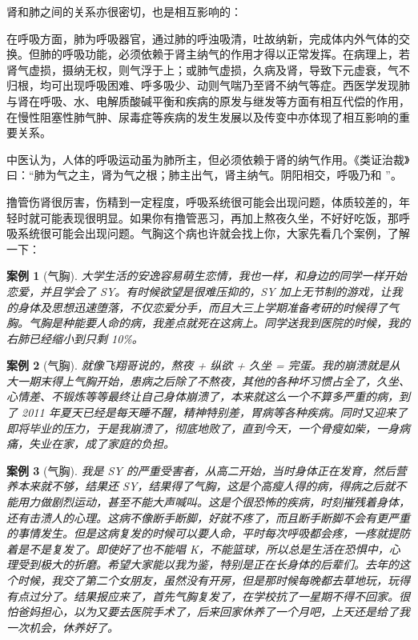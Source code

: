 \documentclass{ctexart}
\newtheorem{case}{案例}
\begin{document}
肾和肺之间的关系亦很密切，也是相互影响的：

在呼吸方面，肺为呼吸器官，通过肺的呼浊吸清，吐故纳新，完成体内外气体的交换。但肺的呼吸功能，必须依赖于肾主纳气的作用才得以正常发挥。在病理上，若肾气虚损，摄纳无权，则气浮于上；或肺气虚损，久病及肾，导致下元虚衰，气不归根，均可出现呼吸困难、呼多吸少、动则气喘乃至肾不纳气等症。西医学发现肺与肾在呼吸、水、电解质酸碱平衡和疾病的原发与继发等方面有相互代偿的作用，在慢性阻塞性肺气肿、尿毒症等疾病的发生发展以及传变中亦体现了相互影响的重要关系。

中医认为，人体的呼吸运动虽为肺所主，但必须依赖于肾的纳气作用。《类证治裁》曰：“肺为气之主，肾为气之根；肺主出气，肾主纳气。阴阳相交，呼吸乃和 ”。

撸管伤肾很厉害，伤精到一定程度，呼吸系统很可能会出现问题，体质较差的，年轻时就可能表现很明显。如果你有撸管恶习，再加上熬夜久坐，不好好吃饭，那呼吸系统很可能会出现问题。气胸这个病也许就会找上你，大家先看几个案例，了解一下：

\begin{case}[气胸]
    大学生活的安逸容易萌生恋情，我也一样，和身边的同学一样开始恋爱，并且学会了 SY。有时候欲望是很难压抑的，SY 加上无节制的游戏，让我的身体及思想迅速堕落，不仅恋爱分手，而且大三上学期准备考研的时候得了气胸。气胸是种能要人命的病，我差点就死在这病上。同学送我到医院的时候，我的右肺已经缩小到只剩 10\%。
\end{case}

\begin{case}[气胸]
    就像飞翔哥说的，熬夜 + 纵欲 + 久坐 = 完蛋。我的崩溃就是从大一期末得上气胸开始，患病之后除了不熬夜，其他的各种坏习惯占全了，久坐、心情差、不锻炼等等最终让自己身体崩溃了，本来就这么一个不算多严重的病，到了 2011 年夏天已经是每天睡不醒，精神特别差，胃病等各种疾病。同时又迎来了即将毕业的压力，于是我崩溃了，彻底地败了，直到今天，一个骨瘦如柴，一身病痛，失业在家，成了家庭的负担。
\end{case}

\begin{case}[气胸]
    我是 SY 的严重受害者，从高二开始，当时身体正在发育，然后营养本来就不够，结果还 SY，结果得了气胸，这是个高瘦人得的病，得病之后就不能用力做剧烈运动，甚至不能大声喊叫。这是个很恐怖的疾病，时刻摧残着身体，还有击溃人的心理。这病不像断手断脚，好就不疼了，而且断手断脚不会有更严重的事情发生。但是这病复发的时候可以要人命，平时每次呼吸都会疼，一疼就提防着是不是复发了。即使好了也不能唱 K，不能篮球，所以总是生活在恐惧中，心理受到极大的折磨。希望大家能以我为鉴，特别是正在长身体的后辈们。去年的这个时候，我交了第二个女朋友，虽然没有开房，但是那时候每晚都去草地玩，玩得有点过分了。结果报应来了，首先气胸复发了，在学校抗了一星期不得不回家。很怕爸妈担心，以为又要去医院手术了，后来回家休养了一个月吧，上天还是给了我一次机会，休养好了。
\end{case}
\end{document}

